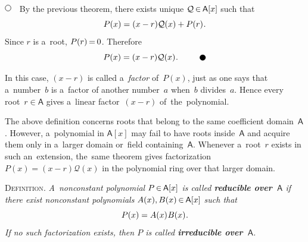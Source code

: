 \documentclass[11pt, twoside]{book}
\newcommand\nfex{\hspace{-0.2ex}} %
\newcommand\thex{\hspace{.1ex}} %
\newcommand\domain{\mathsf{A}}
\newcommand\polynomialring[1]{\domain[#1]}
\newcommand\cin{\nfex\in\nfex}
\newcommand\ceq{\nfex=\nfex}
\newcommand\theproofbegins{\ensuremath{\tikz[baseline=-1ex] \draw [line width=.5pt, color=black, fill=white] (0, 0) circle (.8ex); \hspace{.6em}}}
\newcommand\theproofends{\ensuremath{\hspace{.6em} \tikz[baseline=-0.6ex] \draw [color=black, fill=black] (0, 0) circle (.8ex);}}
\begin{document}
\vspace{-0.25em}
\noindent
\theproofbegins
By the previous theorem,
there exists unique ${\mathcal{Q} \cin \polynomialring{x}}$ such that
%
\begin{equation*}
P(x) = (x-r) \mathcal{Q}(x) + P(r)
\thex .
\end{equation*}
%
Since ${r}$ is a~root, ${P(r) \ceq 0}$.
Therefore
%
\begin{equation*}
P(x) = (x-r) \mathcal{Q}(x)
\thex .
\tag*{\theproofends}
\end{equation*}

%
%

In this case, $(x-r)$ is called a~\emph{factor} of~$P(x)$,
just as one says that a~number~$b$ is a~factor of another number~$a$ when~$b$ divides~$a$.
Hence every root~$r \in \domain$ gives a~linear factor~$(x-r)$ of~the~polynomial.

\vspace{.5em}

%
%

The above definition concerns roots that belong to the same coefficient domain~$\domain$.
However, a~polynomial in $\domain[x]$ may fail to have roots inside~$\domain$
and acquire them only in a~larger domain or~field containing~$\domain$.
Whenever a~root~$r$ exists in such an~extension, the~same theorem gives factorization
${P(x) = (x-r) \mathcal{Q}(x)}$
in the polynomial ring over that larger domain.

\vspace{.5em}

%
%

\noindent
\textsc{Definition}.
{\itshape
A~nonconstant polynomial ${P \cin \domain[x]}$ is called \textbf{reducible over~$\domain$}
if there exist nonconstant polynomials
${A(x), B(x) \cin \domain[x]}$
such that
}
\vspace{-0.25em}
\begin{equation*}
P(x) = A(x) \thex B(x)
\hspace{.1ex} .
\vspace{-0.25em}
\end{equation*}
{\itshape
If no such factorization exists, then ${P}$ is called \textbf{irreducible over~$\domain$}.
}
\end{document}
